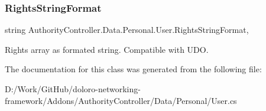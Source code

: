 \subsubsection{\texorpdfstring{Rights\+String\+Format}{RightsStringFormat}}
{\footnotesize\ttfamily string Authority\+Controller.\+Data.\+Personal.\+User.\+Rights\+String\+Format\hspace{0.3cm}{\ttfamily [get]}, {\ttfamily [set]}}



Rights array as formated string. Compatible with U\+DO. 



The documentation for this class was generated from the following file\+:\begin{DoxyCompactItemize}
\item 
D\+:/\+Work/\+Git\+Hub/doloro-\/networking-\/framework/\+Addons/\+Authority\+Controller/\+Data/\+Personal/User.\+cs\end{DoxyCompactItemize}
